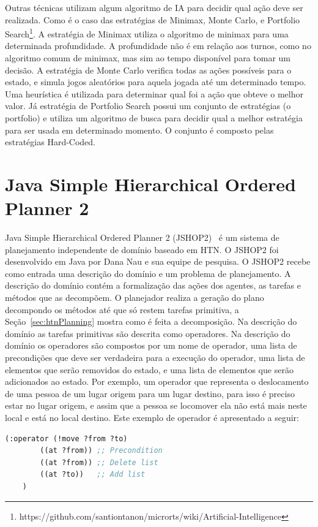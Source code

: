 Outras técnicas utilizam algum algoritmo de IA para decidir qual ação deve ser realizada.
Como é o caso das estratégias de Minimax\cite{ontanon2012minimax}, Monte Carlo, e Portfolio Search\footnote{https://github.com/santiontanon/microrts/wiki/Artificial-Intelligence}.
A estratégia de Minimax utiliza o algoritmo de minimax para uma determinada profundidade. A profundidade não é em relação aos turnos, como no algoritmo comum de minimax, mas sim ao tempo disponível para tomar um decisão.
A estratégia de Monte Carlo verifica todas as ações possíveis para o estado, e simula jogos aleatórios para aquela jogada até um determinado tempo. Uma heurística é utilizada para determinar qual foi a ação que obteve o melhor valor.
Já estratégia de Portfolio Search possui um conjunto de estratégias (o portfolio) e utiliza um algoritmo de busca para decidir qual a melhor estratégia para ser usada em determinado momento. 
O conjunto é composto pelas estratégias Hard-Coded.

\section{Java Simple Hierarchical Ordered Planner 2}\label{sec:jshop}
		
Java Simple Hierarchical Ordered Planner 2 (JSHOP2)~\cite{nauJSHOP2} é um sistema de planejamento independente de domínio baseado em HTN. 
O JSHOP2 foi desenvolvido em Java por Dana Nau e sua equipe de pesquisa.  
O JSHOP2 recebe como entrada uma descrição do domínio e um problema de planejamento.
A descrição do domínio contém a formalização das ações dos agentes, as tarefas e métodos que as decompõem.
O planejador realiza a geração do plano decompondo os métodos até que só restem tarefas primitiva, a Seção~\ref{sec:htnPlanning} mostra como é feita a decomposição. 
Na descrição do domínio as tarefas primitivas são descrita como operadores. 
Na descrição do domínio os operadores são compostos por um nome de operador, uma lista de precondições que deve ser verdadeira para a execução do operador, uma lista de elementos que serão removidos do estado, e uma lista de elementos que serão adicionados ao estado. 
Por exemplo, um operador que representa o deslocamento de uma pessoa de um lugar origem para um lugar destino, para isso é preciso estar no lugar origem, e assim que a pessoa se locomover ela não está mais neste local e está no local destino. Este exemplo de operador é apresentado a seguir:

\lstset{style=codeStyle}
\begin{lstlisting}[language=lisp]
	(:operator (!move ?from ?to) 
		((at ?from)) ;; Precondition
		((at ?from)) ;; Delete list
		((at ?to))   ;; Add list
	)
\end{lstlisting}

